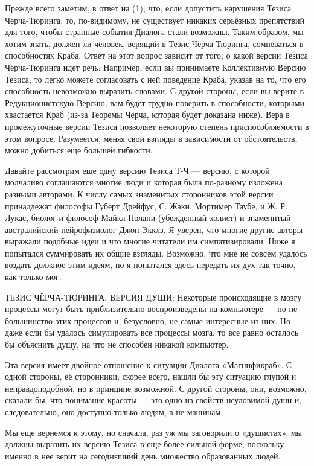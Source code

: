\documentclass[../main.tex]{subfiles}
\begin{document}
Прежде всего заметим, в ответ на (1), что, если допустить нарушения Тезиса Чёрча-Тюринга, то, по-видимому, не существует никаких серьёзных препятствий для того, чтобы странные события Диалога стали возможны. Таким образом, мы хотим знать, должен ли человек, верящий в Тезис Чёрча-Тюринга, сомневаться в способностях Краба. Ответ на этот вопрос зависит от того, о какой версии Тезиса Чёрча-Тюринга идет речь. Например, если вы принимаете Коллективную Версию Тезиса, то легко можете согласовать с ней поведение Краба, указав на то, что его способность невозможно выразить словами. С другой стороны, если вы верите в Редукционистскую Версию, вам будет трудно поверить в способности, которыми хвастается Краб (из-за Теоремы Чёрча, которая будет доказана ниже). Вера в промежуточные версии Тезиса позволяет некоторую степень приспособляемости в этом вопросе. Разумеется, меняя свои взгляды в зависимости от обстоятельств, можно добиться еще большей гибкости.

Давайте рассмотрим еще одну версию Тезиса Т-Ч --- версию, с которой молчаливо соглашаются многие люди и которая была по-разному изложена разными авторами. К числу самых знаменитых сторонников этой версии принадлежат философы Губерт Дрейфус, С. Жаки, Мортимер Таубе, и Ж. Р. Лукас, биолог и философ Майкл Полани (убежденный холист) и знаменитый австралийский нейрофизиолог Джон Экклз. Я уверен, что многие другие авторы выражали подобные идеи и что многие читатели им симпатизировали. Ниже я попытался суммировать их общие взгляды. Возможно, что мне не совсем удалось воздать должное этим идеям, но я попытался здесь передать их дух так точно, как только мог.

ТЕЗИС ЧЁРЧА-ТЮРИНГА, ВЕРСИЯ ДУШИ: Некоторые происходящие в мозгу процессы могут быть приблизительно воспроизведены на компьютере --- но не большинство этих процессов и, безусловно, не самые интересные из них. Но даже если бы удалось симулировать все процессы мозга, то все равно осталось бы объяснить душу, на что не способен никакой компьютер.

Эта версия имеет двойное отношение к ситуации Диалога «Магнификраб». С одной стороны, её сторонники, скорее всего, нашли бы эту ситуацию глупой и неправдоподобной, но в принципе возможной. С другой стороны, они, возможно, сказали бы, что понимание красоты --- это одно из свойств неуловимой души и, следовательно, оно доступно только людям, а не машинам.

Мы еще вернемся к этому, но сначала, раз уж мы заговорили о «душистах», мы должны выразить их версию Тезиса в еще более сильной форме, поскольку именно в нее верит на сегодняшний день множество образованных людей.
\end{document}
